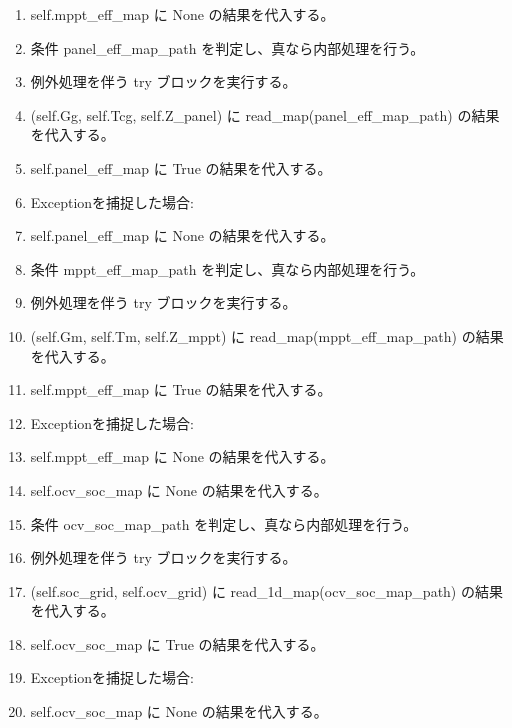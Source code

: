 \documentclass[a4paper,11pt]{article}
\begin{document}
\begin{enumerate}[leftmargin=1.8em]
\item self.mppt\_eff\_map に None の結果を代入する。
\item 条件 panel\_eff\_map\_path を判定し、真なら内部処理を行う。
\item   例外処理を伴う try ブロックを実行する。
\item     (self.Gg, self.Tcg, self.Z\_panel) に read\_map(panel\_eff\_map\_path) の結果を代入する。
\item     self.panel\_eff\_map に True の結果を代入する。
\item     Exceptionを捕捉した場合:
\item     self.panel\_eff\_map に None の結果を代入する。
\item 条件 mppt\_eff\_map\_path を判定し、真なら内部処理を行う。
\item   例外処理を伴う try ブロックを実行する。
\item     (self.Gm, self.Tm, self.Z\_mppt) に read\_map(mppt\_eff\_map\_path) の結果を代入する。
\item     self.mppt\_eff\_map に True の結果を代入する。
\item     Exceptionを捕捉した場合:
\item     self.mppt\_eff\_map に None の結果を代入する。
\item self.ocv\_soc\_map に None の結果を代入する。
\item 条件 ocv\_soc\_map\_path を判定し、真なら内部処理を行う。
\item   例外処理を伴う try ブロックを実行する。
\item     (self.soc\_grid, self.ocv\_grid) に read\_1d\_map(ocv\_soc\_map\_path) の結果を代入する。
\item     self.ocv\_soc\_map に True の結果を代入する。
\item     Exceptionを捕捉した場合:
\item     self.ocv\_soc\_map に None の結果を代入する。
            \end{enumerate}
\end{document}
